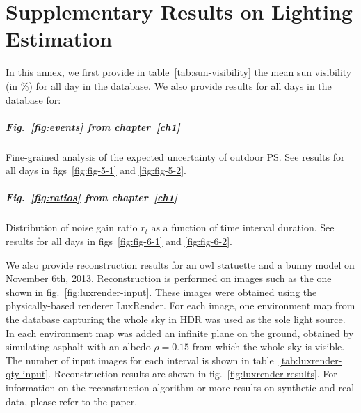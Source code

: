 \chapter{Supplementary Results on Lighting Estimation}     %
\label{annex3}

\graphicspath{{annex3_figures/}}


In this annex, we first provide in table~\ref{tab:sun-visibility} the mean sun visibility (in \%) for all day in the database. We also provide results for all days in the database for: 
\vspace{-.5em}
\paragraph{Fig.~\ref{fig:events} from chapter~\ref{ch1}} Fine-grained analysis of the expected uncertainty of outdoor PS. See results for all days in figs~\ref{fig:fig-5-1} and \ref{fig:fig-5-2}.


\paragraph{Fig.~\ref{fig:ratios} from chapter~\ref{ch1}} Distribution of noise gain ratio $r_t$ as a function of time interval duration. See results for all days in figs~\ref{fig:fig-6-1} and \ref{fig:fig-6-2}.

\vspace{1em}


We also provide reconstruction results for an owl statuette and a bunny model on November 6th, 2013. Reconstruction is performed on images such as the one shown in fig.~\ref{fig:luxrender-input}. These images were obtained using the physically-based renderer LuxRender. For each image, one environment map from the database capturing the whole sky in HDR was used as the sole light source. In each environment map was added an infinite plane on the ground, obtained by simulating asphalt with an albedo $\rho = 0.15$ from which the whole sky is visible. The number of input images for each interval is shown in table~\ref{tab:luxrender-qty-input}. Reconstruction results are shown in fig.~\ref{fig:luxrender-results}. For information on the reconstruction algorithm or more results on synthetic and real data, please refer to the paper.


